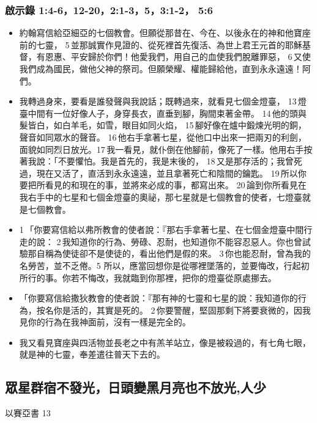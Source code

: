 \subsubsection{啟示錄 1:4-6，12-20，2:1-3，5，3:1-2， 5:6}
\begin{itemize} 
\itemsep-.25em
\item 約翰寫信給亞細亞的七個教會。但願從那昔在、今在、以後永在的神和他寶座前的七靈， 5 並那誠實作見證的、從死裡首先復活、為世上君王元首的耶穌基督，有恩惠、平安歸於你們！他愛我們，用自己的血使我們脫離罪惡， 6 又使我們成為國民，做他父神的祭司。但願榮耀、權能歸給他，直到永永遠遠！阿們。
\item 我轉過身來，要看是誰發聲與我說話；既轉過來，就看見七個金燈臺， 13 燈臺中間有一位好像人子，身穿長衣，直垂到腳，胸間束著金帶。 14 他的頭與髮皆白，如白羊毛，如雪，眼目如同火焰， 15 腳好像在爐中鍛煉光明的銅，聲音如同眾水的聲音。 16 他右手拿著七星，從他口中出來一把兩刃的利劍，面貌如同烈日放光。17 我一看見，就仆倒在他腳前，像死了一樣。他用右手按著我說：「不要懼怕。我是首先的，我是末後的， 18 又是那存活的；我曾死過，現在又活了，直活到永永遠遠，並且拿著死亡和陰間的鑰匙。 19 所以你要把所看見的和現在的事，並將來必成的事，都寫出來。 20 論到你所看見在我右手中的七星和七個金燈臺的奧祕，那七星就是七個教會的使者，七燈臺就是七個教會。
\item 1 「你要寫信給以弗所教會的使者說：『那右手拿著七星、在七個金燈臺中間行走的說： 2 我知道你的行為、勞碌、忍耐，也知道你不能容忍惡人。你也曾試驗那自稱為使徒卻不是使徒的，看出他們是假的來。 3 你也能忍耐，曾為我的名勞苦，並不乏倦。5 所以，應當回想你是從哪裡墜落的，並要悔改，行起初所行的事。你若不悔改，我就臨到你那裡，把你的燈臺從原處挪去。
\item 「你要寫信給撒狄教會的使者說：『那有神的七靈和七星的說：我知道你的行為，按名你是活的，其實是死的。 2 你要警醒，堅固那剩下將要衰微的，因我見你的行為在我神面前，沒有一樣是完全的。
\item 我又看見寶座與四活物並長老之中有羔羊站立，像是被殺過的，有七角七眼，就是神的七靈，奉差遣往普天下去的。
\end{itemize} 

















\subsection{眾星群宿不發光，日頭變黑月亮也不放光,人少}
以賽亞書 13

